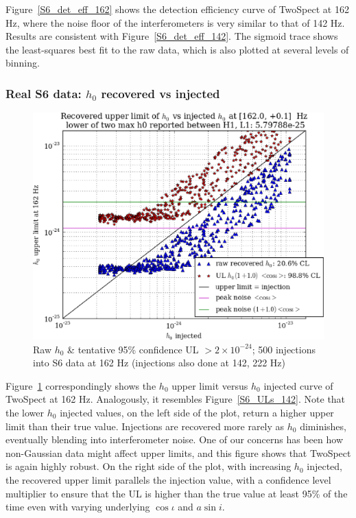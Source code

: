 Figure~\ref{S6_det_eff_162} shows the detection efficiency curve of TwoSpect at 162 Hz, where the noise floor of the interferometers is very similar to that of 142 Hz. 
Results are consistent with Figure~\ref{S6_det_eff_142}.
The sigmoid trace shows the least-squares best fit to the raw data, which is also plotted at several levels of binning.

\subsubsection{Real S6 data: $h_0$ recovered vs injected}

\begin{figure}
\begin{center}
\includegraphics[width=0.5\paperwidth,height=0.35\paperheight]{plots/h0UL-vs-h0injected-162-0Hz.eps}
\caption{
Raw $h_0$ \& tentative 95\% confidence UL $>2\times10^{-24}$; 500 injections
into S6 data at 162 Hz (injections also done at 142, 222 Hz)}
\label{S6_ULs_162}
\end{center}
\end{figure}


Figure~\ref{S6_ULs_162} correspondingly shows the $h_0$ upper limit versus $h_0$ injected curve of TwoSpect at 162 Hz.
Analogously, it resembles Figure~\ref{S6_ULs_142}.
Note that the lower $h_0$ injected values, on the left side of the plot, return a higher upper limit than their true value.
Injections are recovered more rarely as $h_0$ diminishes, eventually blending into interferometer noise.
One of our concerns has been how non-Gaussian data might affect upper limits, and this figure shows that TwoSpect is again highly robust.
On the right side of the plot, with increasing $h_0$ injected, the recovered upper limit parallels the injection value, with a confidence level multiplier to ensure that the UL is higher than the true value at least 95\% of the time even with varying underlying $\cos \iota$ and $a \sin i$.

